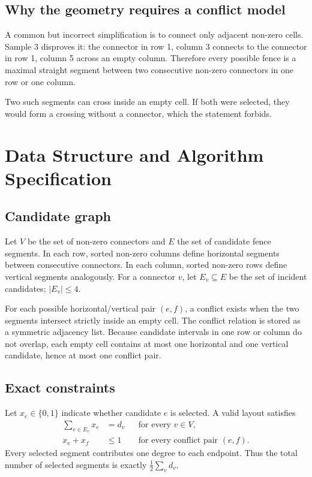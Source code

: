 \documentclass[11pt,a4paper]{article}
\begin{document}
\subsection{Why the geometry requires a conflict model}

A common but incorrect simplification is to connect only adjacent non-zero
cells. Sample 3 disproves it: the connector in row 1, column 3 connects to the
connector in row 1, column 5 across an empty column. Therefore every possible
fence is a maximal straight segment between two consecutive non-zero connectors
in one row or one column.

Two such segments can cross inside an empty cell. If both were selected, they
would form a crossing without a connector, which the statement forbids.

\section{Data Structure and Algorithm Specification}

\subsection{Candidate graph}

Let $V$ be the set of non-zero connectors and $E$ the set of candidate fence
segments. In each row, sorted non-zero columns define horizontal segments
between consecutive connectors. In each column, sorted non-zero rows define
vertical segments analogously. For a connector $v$, let $E_v\subseteq E$ be
the set of incident candidates; $|E_v|\le 4$.

For each possible horizontal/vertical pair $(e,f)$, a conflict exists when the
two segments intersect strictly inside an empty cell. The conflict relation is
stored as a symmetric adjacency list. Because candidate intervals in one row
or column do not overlap, each empty cell contains at most one horizontal and
one vertical candidate, hence at most one conflict pair.

\subsection{Exact constraints}

Let $x_e\in\{0,1\}$ indicate whether candidate $e$ is selected. A valid layout
satisfies
\begin{align}
  \sum_{e\in E_v} x_e &= d_v && \text{for every }v\in V,\\
  x_e+x_f &\le 1 && \text{for every conflict pair }(e,f).
\end{align}
Every selected segment contributes one degree to each endpoint. Thus the total
number of selected segments is exactly $\frac{1}{2}\sum_v d_v$.
\end{document}
